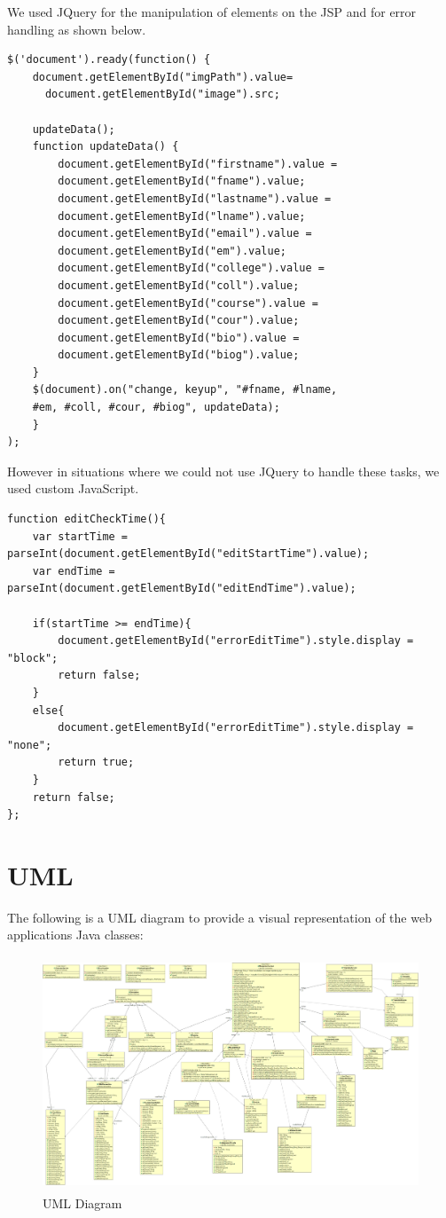 We used JQuery for the manipulation of elements on the JSP and for error handling as shown below.
\begin{verbatim}
$('document').ready(function() {
    document.getElementById("imgPath").value=
      document.getElementById("image").src;
	
    updateData();
    function updateData() {
        document.getElementById("firstname").value =
        document.getElementById("fname").value;
        document.getElementById("lastname").value =
        document.getElementById("lname").value;
        document.getElementById("email").value =
        document.getElementById("em").value;
        document.getElementById("college").value =
        document.getElementById("coll").value;
        document.getElementById("course").value =
        document.getElementById("cour").value;
        document.getElementById("bio").value =
        document.getElementById("biog").value;
    }
    $(document).on("change, keyup", "#fname, #lname,
    #em, #coll, #cour, #biog", updateData);
    }
);

\end{verbatim}
However in situations where we could not use JQuery to handle these tasks, we used custom JavaScript.

\begin{verbatim}
function editCheckTime(){
    var startTime = parseInt(document.getElementById("editStartTime").value);
    var endTime = parseInt(document.getElementById("editEndTime").value);
    
    if(startTime >= endTime){
        document.getElementById("errorEditTime").style.display = "block";
        return false;
    }
    else{
        document.getElementById("errorEditTime").style.display = "none";
        return true;
    }
    return false;
};
\end{verbatim}

\section{UML}
The following is a UML diagram to provide a visual representation of the web applications Java classes:

\begin{figure}[h]
\centering
\includegraphics[width=12cm, height=7cm]{img/UML}
\caption{UML Diagram}
\end{figure}

